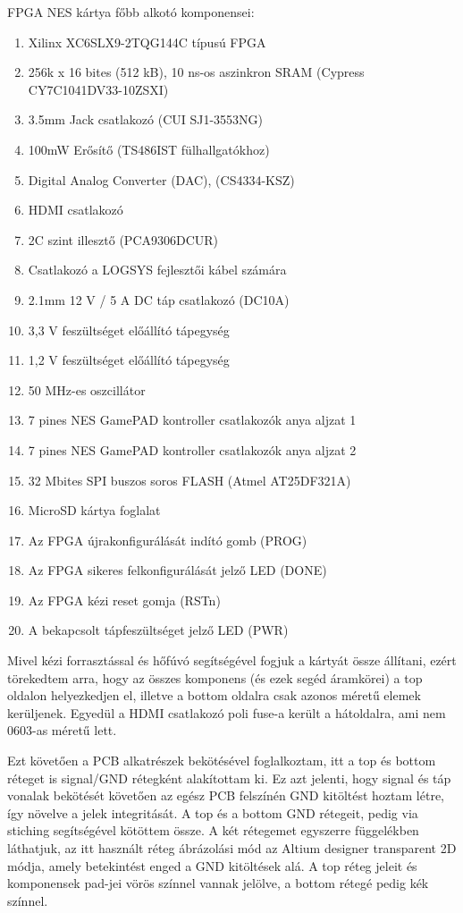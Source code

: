	FPGA NES kártya főbb alkotó komponensei:
	\begin{enumerate}
		\item Xilinx XC6SLX9-2TQG144C típusú FPGA
		\item 256k x 16 bites (512 kB), 10 ns-os aszinkron SRAM (Cypress CY7C1041DV33-10ZSXI)
		\item 3.5mm Jack csatlakozó (CUI SJ1-3553NG)
		\item 100mW Erősítő (TS486IST fülhallgatókhoz)
		\item Digital Analog Converter (DAC), (CS4334-KSZ)
		\item HDMI csatlakozó
		\item 2C szint illesztő (PCA9306DCUR)
		\item Csatlakozó a LOGSYS fejlesztői kábel számára
		\item 2.1mm 12 V / 5 A DC táp csatlakozó (DC10A)
		\item 3,3 V feszültséget előállító tápegység
		\item 1,2 V feszültséget előállító tápegység
		\item 50 MHz-es oszcillátor 
		\item 7 pines NES GamePAD kontroller csatlakozók anya aljzat 1
		\item 7 pines NES GamePAD kontroller csatlakozók anya aljzat 2
		\item 32 Mbites SPI buszos soros FLASH (Atmel AT25DF321A)
		\item MicroSD kártya foglalat
		\item Az FPGA újrakonfigurálását indító gomb (PROG)
		\item Az FPGA sikeres felkonfigurálását jelző LED (DONE)
		\item Az FPGA kézi reset gomja (RSTn)
		\item A bekapcsolt tápfeszültséget jelző LED (PWR)
	\end{enumerate}
	
	Mivel kézi forrasztással és hőfúvó segítségével fogjuk a kártyát össze állítani, ezért törekedtem arra, hogy az összes komponens (és ezek segéd áramkörei) a top oldalon helyezkedjen el, illetve a bottom oldalra csak azonos méretű elemek kerüljenek. Egyedül a HDMI csatlakozó poli fuse-a került a hátoldalra, ami nem 0603-as méretű lett.
	
	Ezt követően a PCB alkatrészek bekötésével foglalkoztam, itt a top és bottom réteget is signal/GND rétegként alakítottam ki. Ez azt jelenti, hogy signal és táp vonalak bekötését követően az egész PCB felszínén GND kitöltést hoztam létre, így növelve a jelek integritását. A top és a bottom GND rétegeit, pedig via stiching segítségével kötöttem össze. A két rétegemet egyszerre  függelékben láthatjuk, az itt használt réteg ábrázolási mód az Altium designer transparent 2D módja, amely betekintést enged a GND kitöltések alá. A top réteg jeleit és komponensek pad-jei vörös színnel vannak jelölve, a bottom rétegé pedig kék színnel.
	
